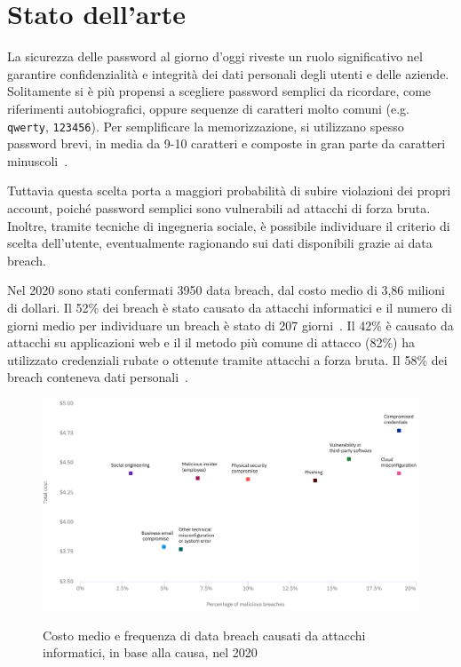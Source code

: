 \chapter{Stato dell'arte}

\label{ch:state of the art}

La sicurezza delle password al giorno d'oggi riveste un ruolo significativo nel garantire confidenzialità e integrità dei dati personali degli utenti e delle aziende.
Solitamente si è più propensi a scegliere password semplici da ricordare, come riferimenti autobiografici, oppure sequenze di caratteri molto comuni (e.g. \texttt{qwerty}, \texttt{123456}).
Per semplificare la memorizzazione, si utilizzano spesso password brevi, in media da 9-10 caratteri e composte in gran parte da caratteri minuscoli~\cite{obspasshab}.

Tuttavia questa scelta porta a maggiori probabilità di subire violazioni dei propri account, poiché password semplici sono vulnerabili ad attacchi di forza bruta. Inoltre, tramite tecniche di ingegneria sociale, è possibile individuare il criterio di scelta dell'utente, eventualmente ragionando sui dati disponibili grazie ai data breach.

Nel 2020 sono stati confermati 3950 data breach, dal costo medio di 3,86 milioni di dollari. Il 52\% dei breach è stato causato da attacchi informatici e il numero di giorni medio per individuare un breach è stato di 207 giorni~\cite{ibmcost}.
Il 42\% è causato da attacchi su applicazioni web e il il metodo più comune di attacco (82\%) ha utilizzato credenziali rubate o ottenute tramite attacchi a forza bruta.
Il 58\% dei breach conteneva dati personali~\cite{verizon}.
\begin{figure}[h]
    \centering
    \includegraphics[width=15cm]{./immagini/prova.png}
    \label{data breach}
    \caption{Costo medio e frequenza di data breach causati da attacchi informatici, in base alla causa, nel 2020~\cite{ibmcost}}
\end{figure}

